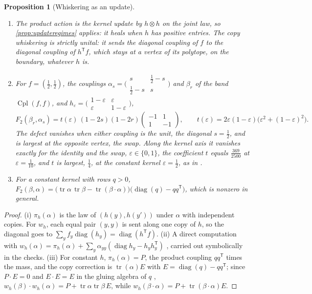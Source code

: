 \documentclass[11pt]{article}
\newtheorem{proposition}[theorem]{Proposition}
\theoremstyle{definition}
\theoremstyle{remark}
\newcommand{\Cpl}{\operatorname{Cpl}}
\newcommand{\diag}{\operatorname{diag}}
\newcommand{\T}{\mathsf T}
\begin{document}
\begin{proposition}[Whiskering as an update]\label{prop:whisker}
\begin{enumerate}[label=(\roman*)]
\item The product action is the kernel update by $h\otimes h$ on the joint law, so \cref{prop:updateregimes} applies: it heals when $h$ has
  positive entries. The copy whiskering is strictly unital: it sends the diagonal coupling of $f$ to the diagonal coupling of $h^\T f$,
  which stays at a vertex of its polytope, on the boundary, whatever $h$ is.
\item For $f=(\frac12,\frac12)$, the couplings $\alpha_s=\bigl(\begin{smallmatrix}s&\frac12-s\\\frac12-s&s\end{smallmatrix}\bigr)$ and $\beta_r$ of the band
  $\Cpl(f,f)$, and $h_\varepsilon=\bigl(\begin{smallmatrix}1-\varepsilon&\varepsilon\\\varepsilon&1-\varepsilon\end{smallmatrix}\bigr)$,
  \[
  F_2(\beta_r,\alpha_s)=t(\varepsilon)\,(1-2s)(1-2r)\begin{pmatrix}-1&1\\1&-1\end{pmatrix},\qquad t(\varepsilon)=2\varepsilon(1-\varepsilon)\bigl(\varepsilon^2+(1-\varepsilon)^2\bigr).
  \]
  The defect vanishes when either coupling is the unit, the diagonal $s=\frac12$, and is largest at the opposite vertex, the swap. Along the
  kernel axis it vanishes exactly for the identity and the swap, $\varepsilon\in\{0,1\}$, the coefficient $t$ equals $\frac{369}{2500}$ at $\varepsilon=\frac1{10}$, and $t$
  is largest, $\frac14$, at the constant kernel $\varepsilon=\frac12$, as in \cite[Prop.~4.3]{Family}.
\item For a constant kernel with rows $q>0$, $F_2(\beta,\alpha)=\bigl(\operatorname{tr}\alpha\,\operatorname{tr}\beta-\operatorname{tr}(\beta\cdot\alpha)\bigr)\bigl(\diag(q)-qq^\T\bigr)$,
  which is nonzero in general.
\end{enumerate}
\end{proposition}
\begin{proof}
(i) $\pi_h(\alpha)$ is the law of $(h(y),h(y'))$ under $\alpha$ with independent copies. For $w_h$, each equal pair $(y,y)$ is sent along one copy of
$h$, so the diagonal goes to $\sum_yf_y\diag(h_y)=\diag(h^\T f)$. (ii) A direct computation with $w_h(\alpha)=\pi_h(\alpha)+\sum_y\alpha_{yy}(\diag h_y-h_yh_y^\T)$
\cite[Prop.~4.1]{Algebras}, carried out symbolically in the checks. (iii) For constant $h$, $\pi_h(\alpha)=P$, the product coupling $qq^\T$ times the mass,
and the copy correction is $\operatorname{tr}(\alpha)E$ with $E=\diag(q)-qq^\T$; since $P\cdot E=0$ and $E\cdot E=E$ in the gluing algebra of $q$ \cite[Thm.~2.2]{Algebras},
$w_h(\beta)\cdot w_h(\alpha)=P+\operatorname{tr}\alpha\operatorname{tr}\beta\,E$, while $w_h(\beta\cdot\alpha)=P+\operatorname{tr}(\beta\cdot\alpha)E$.
\end{proof}
\end{document}
